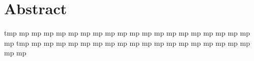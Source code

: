 \section*{Abstract}
  tmp mp mp mp mp mp mp mp mp mp mp mp mp mp mp mp mp mp mp mp mp 
  tmp mp mp mp mp mp mp mp mp mp mp mp mp mp mp mp mp mp mp mp mp 
